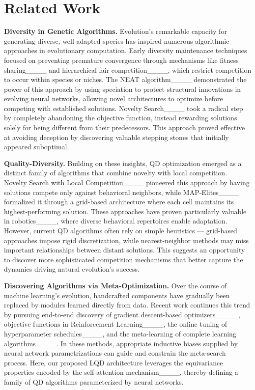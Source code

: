 \section{Related Work}
\textbf{Diversity in Genetic Algorithms.}
Evolution's remarkable capacity for generating diverse, well-adapted species has inspired numerous algorithmic approaches in evolutionary computation. Early diversity maintenance techniques focused on preventing premature convergence through mechanisms like fitness sharing____ and hierarchical fair competition____, which restrict competition to occur within species or niches. The NEAT algorithm____ demonstrated the power of this approach by using speciation to protect structural innovations in evolving neural networks, allowing novel architectures to optimize before competing with established solutions. Novelty Search____ took a radical step by completely abandoning the objective function, instead rewarding solutions solely for being different from their predecessors. This approach proved effective at avoiding deception by discovering valuable stepping stones that initially appeared suboptimal.

\textbf{Quality-Diversity.}
Building on these insights, QD optimization emerged as a distinct family of algorithms that combine novelty with local competition. Novelty Search with Local Competition____ pioneered this approach by having solutions compete only against behavioral neighbors, while MAP-Elites____ formalized it through a grid-based architecture where each cell maintains its highest-performing solution. These approaches have proven particularly valuable in robotics____, where diverse behavioral repertoires enable adaptation. However, current QD algorithms often rely on simple heuristics --- grid-based approaches impose rigid discretization, while nearest-neighbor methods may miss important relationships between distant solutions. This suggests an opportunity to discover more sophisticated competition mechanisms that better capture the dynamics driving natural evolution's success.

\textbf{Discovering Algorithms via Meta-Optimization.}
Over the course of machine learning’s evolution, handcrafted components have gradually been replaced by modules learned directly from data.
Recent work continues this trend by pursuing end-to-end discovery of gradient descent-based optimizers ____, objective functions in Reinforcement Learning____, the online tuning of hyperparameter schedules____, and the meta-learning of complete learning algorithms____.
In these methods, appropriate inductive biases supplied by neural network parametrizations can guide and constrain the meta-search process. Here, our proposed LQD architecture leverages the equivariance properties encoded by the self-attention mechanism____, thereby defining a family of QD algorithms parameterized by neural networks.

